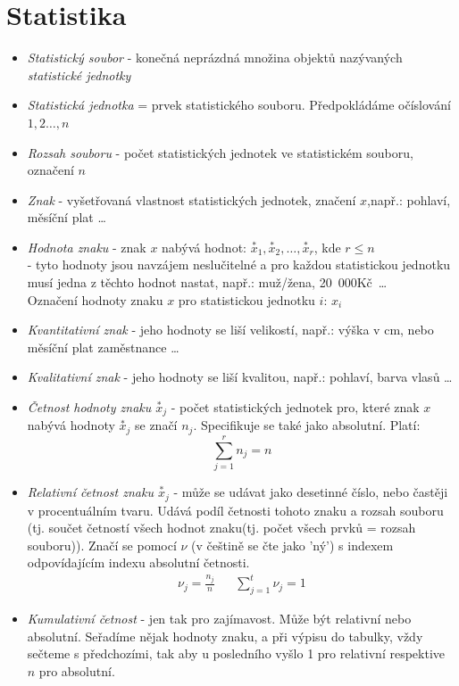 \documentclass[12pt]{article}
\begin{document}
\section{Statistika}
\begin{itemize}
\item \emph{Statistický soubor} - konečná neprázdná množina objektů nazývaných \emph{statistické jednotky}
\item \emph{Statistická jednotka} = prvek statistického souboru. Předpokládáme očíslování $1,2 \dotsc, n $
\item \emph{Rozsah souboru} - počet statistických jednotek ve statistickém souboru, označení $n$
\item \emph{Znak} - vyšetřovaná vlastnost statistických jednotek, značení $x$,např.: pohlaví, měsíční plat \dots
\item \emph{Hodnota znaku} - znak $x$ nabývá hodnot: $\overset{*}{x}_1,\overset{*}{x}_2, \dots , \overset{*}{x}_r$, kde $r \leq n$\\
 - tyto hodnoty jsou navzájem neslučitelné a pro každou statistickou jednotku musí jedna z těchto hodnot  nastat, např.: muž/žena, 20~000Kč~\dots \\Označení hodnoty znaku $x$ pro statistickou jednotku $i$: $x_i$
 \item \emph{Kvantitativní znak} - jeho hodnoty se liší velikostí, např.: výška v cm, nebo měsíční plat zaměstnance \dots 
 \item \emph{Kvalitativní znak} - jeho hodnoty se liší kvalitou, např.: pohlaví, barva vlasů \dots
 \item \emph{Četnost hodnoty znaku $\overset{*}{x}_j$} - počet statistických jednotek pro, které znak $x$ nabývá hodnoty $\overset{*}{x}_j$ se značí $n_j$. Specifikuje se také jako absolutní. Platí:
 \begin{equation}
 \sum^r_{j=1} n_j = n
\end{equation}
 \item \emph{Relativní četnost znaku $\overset{*}{x}_j$} - může se udávat jako desetinné číslo, nebo častěji v procentuálním tvaru. Udává podíl četnosti tohoto znaku a rozsah souboru (tj. součet četností všech hodnot znaku(tj. počet všech prvků = rozsah souboru)). Značí se pomocí $\nu$ (v češtině se čte jako 'ný') s indexem odpovídajícím indexu absolutní četnosti.
 \begin{align}
 \nu_j = \frac{n_j}{n} && \sum^t_{j=1} \nu_j = 1
 \end{align}
\item \emph{Kumulativní četnost} - jen tak pro zajímavost. Může být relativní nebo absolutní. Seřadíme nějak hodnoty znaku, a při výpisu do tabulky, vždy sečteme s předchozími, tak aby u posledního vyšlo 1 pro relativní respektive $n$ pro absolutní.
\end{itemize}
\end{document}
